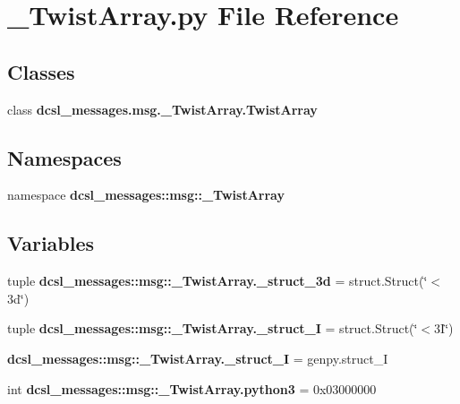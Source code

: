 \section{\-\_\-\-Twist\-Array.\-py \-File \-Reference}
\label{__TwistArray_8py}
\subsection*{\-Classes}
\begin{DoxyCompactItemize}
\item 
class {\bf dcsl\-\_\-messages.\-msg.\-\_\-\-Twist\-Array.\-Twist\-Array}
\end{DoxyCompactItemize}
\subsection*{\-Namespaces}
\begin{DoxyCompactItemize}
\item 
namespace {\bf dcsl\-\_\-messages\-::msg\-::\-\_\-\-Twist\-Array}
\end{DoxyCompactItemize}
\subsection*{\-Variables}
\begin{DoxyCompactItemize}
\item 
tuple {\bf dcsl\-\_\-messages\-::msg\-::\-\_\-\-Twist\-Array.\-\_\-struct\-\_\-3d} = struct.\-Struct(\char`\"{}$<$3d\char`\"{})
\item 
tuple {\bf dcsl\-\_\-messages\-::msg\-::\-\_\-\-Twist\-Array.\-\_\-struct\-\_\-I} = struct.\-Struct(\char`\"{}$<$3\-I\char`\"{})
\item 
{\bf dcsl\-\_\-messages\-::msg\-::\-\_\-\-Twist\-Array.\-\_\-struct\-\_\-\-I} = genpy.\-struct\-\_\-\-I
\item 
int {\bf dcsl\-\_\-messages\-::msg\-::\-\_\-\-Twist\-Array.\-python3} = 0x03000000
\end{DoxyCompactItemize}
